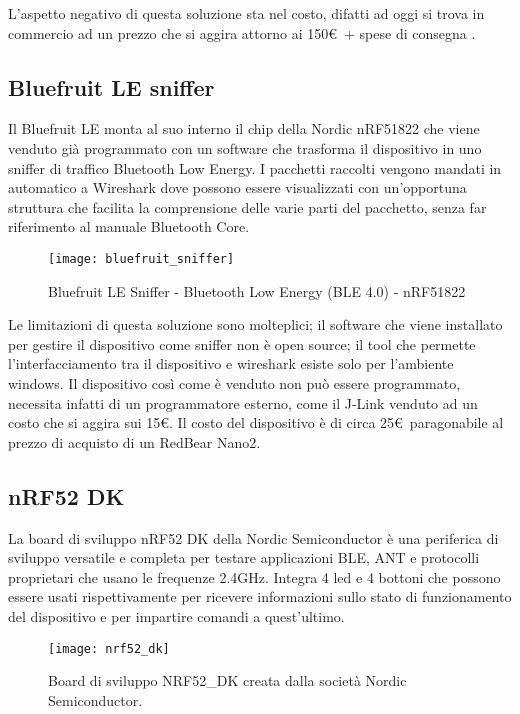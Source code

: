 L'aspetto negativo di questa soluzione sta nel costo, difatti ad oggi si trova in commercio ad un prezzo che si aggira attorno ai 150\euro\  + spese di consegna \cite{ubertooth_reseller_web}.

\subsection{Bluefruit LE sniffer}
Il Bluefruit LE monta al suo interno il chip della Nordic nRF51822 che viene venduto già programmato con un software che trasforma il dispositivo in uno sniffer di traffico Bluetooth Low Energy. I pacchetti raccolti vengono mandati in automatico a Wireshark  dove possono essere visualizzati con un'opportuna struttura che facilita la comprensione delle varie parti del pacchetto, senza far riferimento al manuale Bluetooth Core.

\begin{figure}[H]
\texttt{[image: bluefruit\_sniffer]}
\centering
\caption{Bluefruit LE Sniffer - Bluetooth Low Energy (BLE 4.0) - nRF51822}
\end{figure}

Le limitazioni di questa soluzione sono molteplici; il software che viene installato per gestire il dispositivo come sniffer non è open source; il tool che permette l'interfacciamento tra il dispositivo e wireshark esiste solo per l'ambiente windows. Il dispositivo così come è venduto non può essere programmato, necessita infatti di un programmatore esterno, come il J-Link venduto ad un costo che si aggira sui 15\euro .
Il costo del dispositivo è di circa 25\euro\ paragonabile al prezzo di acquisto di un RedBear Nano2.

\newpage 

\subsection{nRF52 DK}\label{nordic_board}
La board di sviluppo nRF52 DK della Nordic Semiconductor è una periferica di sviluppo versatile e completa per testare applicazioni BLE, ANT e protocolli proprietari che usano le frequenze 2.4GHz. Integra 4 led e 4 bottoni che possono essere usati rispettivamente per ricevere informazioni sullo stato di funzionamento del dispositivo e per impartire comandi a quest'ultimo.

\begin{figure}[H]
\texttt{[image: nrf52\_dk]}
\centering
\caption{Board di sviluppo NRF52\_DK creata dalla società Nordic Semiconductor.}
\end{figure}

